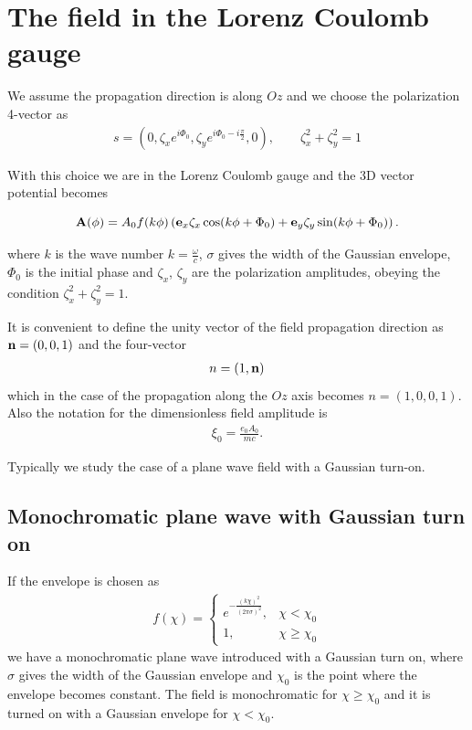 \section{The field in the Lorenz Coulomb gauge}\label{section-lorenz_coulomb}

We assume the propagation direction is along $Oz$ and we choose the polarization 4-vector as
\begin{align}
    s = (0, \zeta_x e^{i\Phi_0}, \zeta_y e^{i\Phi_0 - i\frac{\pi}{2}}, 0),\qquad \zeta_x^2+\zeta_y^2=1
\end{align}

With this choice we are in the Lorenz Coulomb gauge and the 3D vector potential becomes
\begin{importantbox}
    \begin{equation}
        {\bf A}(\phi) = A_0 f(k \phi) \left( {\bf e}_x \zeta_x \cos(k \phi + \Phi_0) + {\bf e}_y \zeta_y \sin(k \phi + \Phi_0) \right).
    \end{equation}
\end{importantbox}

where $k$ is the wave number $k = \frac{\omega}{c}$, $\sigma$  gives the  width of the Gaussian envelope, $\Phi_0$ is the initial phase and $\zeta_x$, $\zeta_y$ are the polarization amplitudes, obeying the condition $\zeta_x^2 + \zeta_y^2 = 1$.

It is convenient to define the unity vector of the field propagation direction as ${\bf n} = (0,0,1)$ and the four-vector
\begin{align}
    n = (1,{\bf n})
\end{align}
which in the case of the propagation along the $Oz$ axis becomes $n = (1,0,0,1)$.
Also the notation for the dimensionless field amplitude is
\begin{align}
    \xi_0 = \frac{e_0 A_0}{mc}.
\end{align}


Typically we study the case of  a plane wave field with a Gaussian turn-on.
\subsection{Monochromatic plane wave with Gaussian turn on}
If the envelope is chosen as
\begin{align}
    f(\chi) = \left\{\begin{array}{ll}
                         e^{-\frac{(k\chi)^2}{(2\pi \sigma)^2}}, & \chi < \chi_0    \\
                         1,                                      & \chi \geq \chi_0
                     \end{array}\right.
\end{align}
we have a monochromatic plane wave introduced with a Gaussian turn on, where $\sigma$ gives the width of the Gaussian envelope and $\chi_0$ is the point where the envelope becomes constant. The field is monochromatic for $\chi \geq \chi_0$ and it is turned on with a Gaussian envelope for $\chi < \chi_0$.
